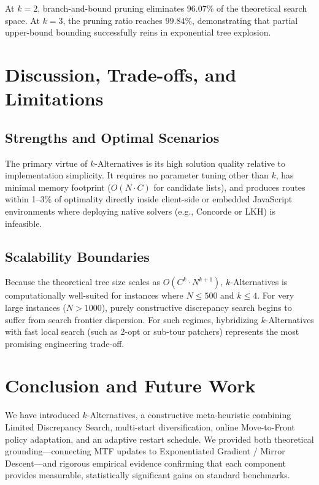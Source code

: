 \documentclass[11pt,a4paper]{article}
\begin{document}
At $k=2$, branch-and-bound pruning eliminates $96.07\%$ of the theoretical search space. At $k=3$, the pruning ratio reaches $99.84\%$, demonstrating that partial upper-bound bounding successfully reins in exponential tree explosion.

\section{Discussion, Trade-offs, and Limitations}
\label{sec:discussion}

\subsection{Strengths and Optimal Scenarios}
The primary virtue of $k$-Alternatives is its high solution quality relative to implementation simplicity. It requires no parameter tuning other than $k$, has minimal memory footprint ($O(N \cdot C)$ for candidate lists), and produces routes within 1--3\% of optimality directly inside client-side or embedded JavaScript environments where deploying native solvers (e.g., Concorde or LKH) is infeasible.

\subsection{Scalability Boundaries}
Because the theoretical tree size scales as $O(C^k \cdot N^{k+1})$, $k$-Alternatives is computationally well-suited for instances where $N \le 500$ and $k \le 4$. For very large instances ($N > 1000$), purely constructive discrepancy search begins to suffer from search frontier dispersion. For such regimes, hybridizing $k$-Alternatives with fast local search (such as 2-opt or sub-tour patchers) represents the most promising engineering trade-off.

\section{Conclusion and Future Work}
\label{sec:conclusion}

We have introduced $k$-Alternatives, a constructive meta-heuristic combining Limited Discrepancy Search, multi-start diversification, online Move-to-Front policy adaptation, and an adaptive restart schedule. We provided both theoretical grounding---connecting MTF updates to Exponentiated Gradient / Mirror Descent---and rigorous empirical evidence confirming that each component provides measurable, statistically significant gains on standard benchmarks.
\end{document}

